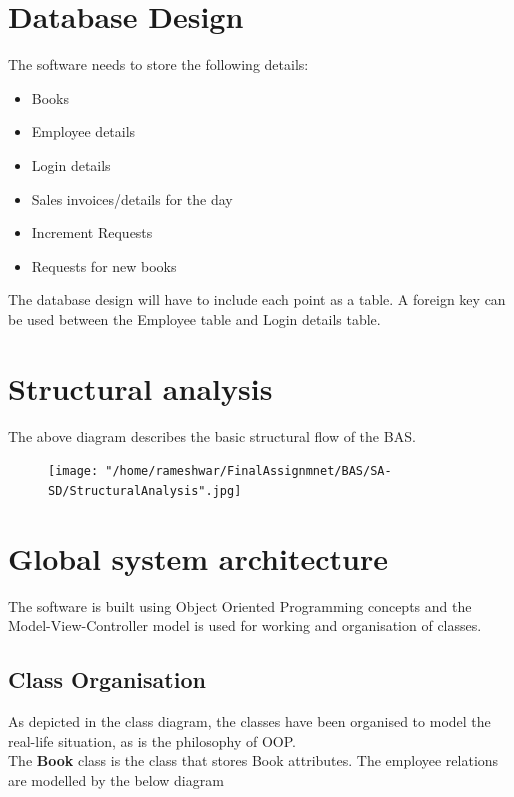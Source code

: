 \documentclass{scrreprt}
\begin{document}
\section{Database Design}
The software needs to store the following details:
\begin{itemize}
\item Books
\item Employee details
\item Login details
\item Sales invoices/details for the day
\item Increment Requests
\item Requests for new books
\end{itemize}

The database design will have to include each point as a table. A foreign key can be used between the Employee table and Login details table. \\

\section{Structural analysis}
The above diagram describes the basic structural flow of the BAS. 
\begin{figure}
\texttt{[image: "/home/rameshwar/FinalAssignmnet/BAS/SA-SD/StructuralAnalysis".jpg]}
\end{figure}

\section{Global system architecture}
The software is built using Object Oriented Programming concepts and the Model-View-Controller model is used for working and organisation of classes. 
\subsection{Class Organisation}
As depicted in the class diagram, the classes have been organised to model the real-life situation, as is the philosophy of OOP. \\ 
The \textbf{Book} class is the class that stores Book attributes. The employee relations are modelled by the below diagram
\end{document}

